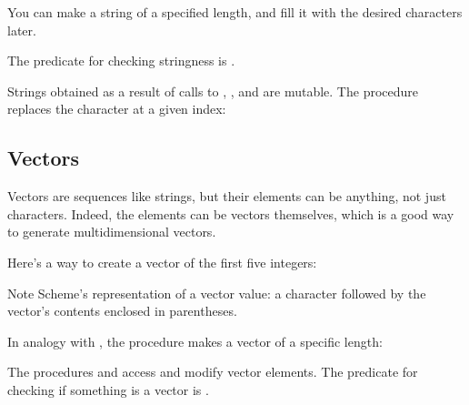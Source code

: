 {


You can make a string of a specified length, and fill it
with the desired characters later.



The predicate for checking stringness is .


Strings obtained as a result of calls to ,
, and  are mutable.
The procedure  replaces the
character at a given index:


\subsection{Vectors}

Vectors are sequences like strings, but their elements can
be anything, not just characters.  Indeed, the elements can
be vectors themselves, which is a good way to generate
multidimensional vectors.


Here’s a way to create a vector of the first five integers:


\n Note Scheme’s representation of a vector value: a \p{#}
character followed by the vector’s contents enclosed in
parentheses.


In analogy with , the procedure
 makes a vector of a specific length:


\n The procedures  and  access and
modify vector elements.
The predicate for checking if something is a vector is .


}
